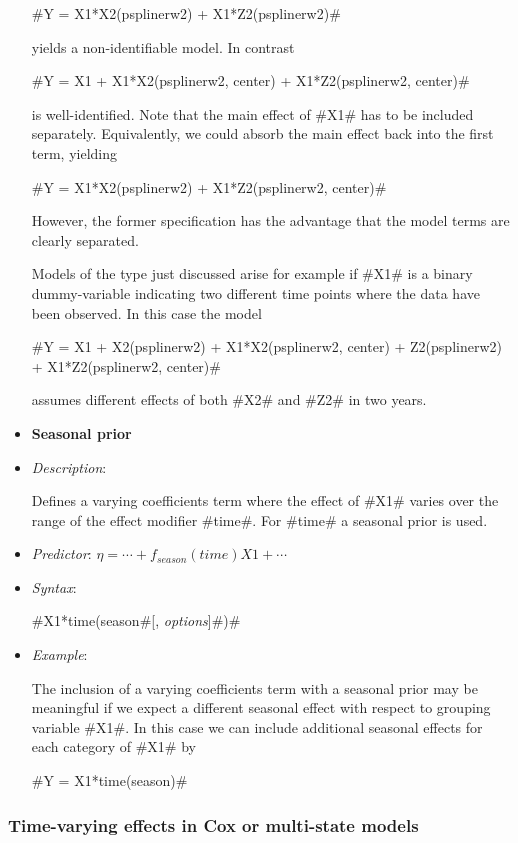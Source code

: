 \begin{itemize}
#Y = X1*X2(psplinerw2) + X1*Z2(psplinerw2)#

yields a non-identifiable model. In contrast

#Y = X1 + X1*X2(psplinerw2, center) + X1*Z2(psplinerw2, center)#

is well-identified. Note that the main effect of #X1# has to be
included separately. Equivalently, we could absorb the main effect
back into the first term, yielding

#Y = X1*X2(psplinerw2) + X1*Z2(psplinerw2, center)#

However, the former specification has the advantage that the model
terms are clearly separated.

Models of the type just discussed arise for example if #X1# is a
binary dummy-variable indicating two different time points where the
data have been observed. In this case the model

 #Y = X1 + X2(psplinerw2) + X1*X2(psplinerw2, center) + Z2(psplinerw2) + X1*Z2(psplinerw2, center)#

assumes different effects of both #X2# and #Z2# in two years.

\item[]{\bf\sffamily Seasonal prior}

\item[] {\em Description}:

Defines a varying coefficients term where the effect of #X1# varies
over the range of the effect modifier #time#. For #time# a seasonal
prior is used.
\item[] {\em Predictor}: $\eta= \cdots + f_{season}(time)X1 + \cdots $
\item[] {\em Syntax}:

#X1*time(season#[, {\em options}]#)#
\item[] {\em Example}:

The inclusion of a varying coefficients term with a seasonal prior
may be meaningful if we expect a different seasonal effect with
respect to grouping variable #X1#. In this case we can include
additional seasonal effects for each category of #X1# by

#Y = X1*time(season)#

\end{itemize}

\subsubsection*{Time-varying effects in Cox or multi-state models}

